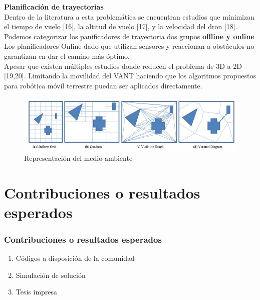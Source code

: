 \documentclass[
	11pt, %
]{beamer}
\begin{document}

\begin{frame}
  \textbf{Planificación de trayectorias}\\
         {\footnotesize
  Dentro de la literatura a esta problemática se encuentran estudios que minimizan el tiempo de vuelo [16], la altitud de vuelo [17], y la velocidad del dron [18]. Podemos categorizar los panificadores de trayectoria dos grupos \textbf{offline y online}\\
  Los planificadores Online dado que utilizan sensores y reaccionan a obstáculos no garantizan en dar el camino más óptimo.\\

  Apesar que existen múltiples estudios donde reducen el problema de 3D a 2D [19,20]. Limitando la movilidad del VANT haciendo que los algoritmos propuestos para robótica móvil terrestre puedan ser aplicados directamente. 
  }
  \begin{figure}
    \includegraphics[width=0.8\linewidth]{maps.png}
    \caption{Representación del medio ambiente}
  \end{figure}
  
\end{frame}


  


\section{Contribuciones o resultados esperados}

\begin{frame}

  \frametitle{Contribuciones o resultados esperados}

  \begin{enumerate}
  \item<1-> Códigos a disposición de la comunidad
  \item<2-> Simulación de solución
  \item<3-> Tesis impresa
  \end{enumerate}
  
\end{frame}
\end{document}
